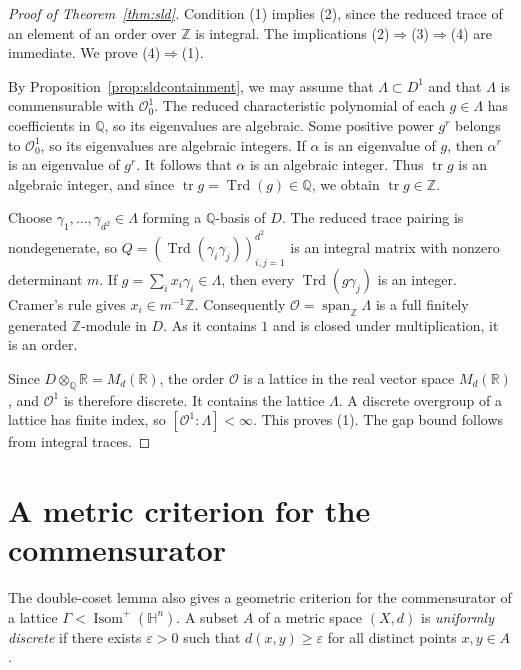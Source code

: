 \documentclass[reqno]{amsart}
\theoremstyle{remark}
\DeclareMathOperator{\tr}{tr}
\DeclareMathOperator{\Trd}{Trd}
\newcommand{\R}{\mathbb R}
\newcommand{\Q}{\mathbb Q}
\newcommand{\Z}{\mathbb Z}
\newcommand{\OO}{\mathcal O}
\begin{document}
\begin{proof}[Proof of Theorem~\ref{thm:sld}]
Condition (1) implies (2), since the reduced trace of an element of an order over $\Z$ is integral. The implications (2)$\Rightarrow$(3)$\Rightarrow$(4) are immediate. We prove (4)$\Rightarrow$(1).

By Proposition~\ref{prop:sldcontainment}, we may assume that $\Lambda\subset D^1$ and that $\Lambda$ is commensurable with $\OO_0^1$. The reduced characteristic polynomial of each $g\in\Lambda$ has coefficients in $\Q$, so its eigenvalues are algebraic. Some positive power $g^r$ belongs to $\OO_0^1$, so its eigenvalues are algebraic integers. If $\alpha$ is an eigenvalue of $g$, then $\alpha^r$ is an eigenvalue of $g^r$. It follows that $\alpha$ is an algebraic integer. Thus $\tr g$ is an algebraic integer, and since $\tr g=\Trd(g)\in\Q$, we obtain $\tr g\in\Z$.

Choose $\gamma_1,\ldots,\gamma_{d^2}\in\Lambda$ forming a $\Q$-basis of $D$. The reduced trace pairing is nondegenerate, so $Q=(\Trd(\gamma_i\gamma_j))_{i,j=1}^{d^2}$ is an integral matrix with nonzero determinant $m$. If $g=\sum_i x_i\gamma_i\in\Lambda$, then every $\Trd(g\gamma_j)$ is an integer. Cramer's rule gives $x_i\in m^{-1}\Z$. Consequently $\OO=\operatorname{span}_{\Z}\Lambda$ is a full finitely generated $\Z$-module in $D$. As it contains $1$ and is closed under multiplication, it is an order.

Since $D\otimes_\Q\R=M_d(\R)$, the order $\OO$ is a lattice in the real vector space $M_d(\R)$, and $\OO^1$ is therefore discrete. It contains the lattice $\Lambda$. A discrete overgroup of a lattice has finite index, so $[\OO^1:\Lambda]<\infty$. This proves (1). The gap bound follows from integral traces.
\end{proof}




\section{A metric criterion for the commensurator}\label{sec:orbits}

The double-coset lemma also gives a geometric criterion for the commensurator of a lattice $\Gamma<\operatorname{Isom}^+(\mathbb H^n)$. A subset $A$ of a metric space $(X,d)$ is \emph{uniformly discrete} if there exists $\varepsilon>0$ such that $d(x,y)\ge\varepsilon$ for all distinct points $x,y\in A$.
\end{document}
